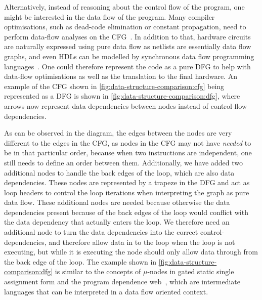 Alternatively, instead of reasoning about the control flow of the program, one
might be interested in the \gls{data flow} of the program.  Many compiler
optimisations, such as dead-code elimination or constant propagation, need to
perform data-flow analyses on the
\gls{CFG}~\cite[]{kildall73_unified_approac_global_progr_optim,kam76_gdfaia}.
In addition to that, hardware circuits are naturally expressed using pure data
flow as netlists are essentially data flow graphs, and even \glspl{HDL} can be
modelled by synchronous data flow programming
languages~\cite{halbwachs91_sdfpll}.  One could therefore represent the code as
a pure \gls{DFG} to help with data-flow optimisations as well as the translation
to the final hardware.  An example of the \gls{CFG} shown in
\cref{fig:data-structure-comparison:cfg} being represented as a \gls{DFG} is
shown in \cref{fig:data-structure-comparison:dfg}, where arrows now represent
data dependencies between nodes instead of control-flow dependencies.

As can be observed in the diagram, the edges between the nodes are very
different to the edges in the \gls{CFG}, as nodes in the \gls{CFG} may not have
\emph{needed} to be in that particular order, because when two instructions are
independent, one still needs to define an order between them.  Additionally, we
have added two additional nodes to handle the back edges of the loop, which are
also data dependencies.  These nodes are represented by a trapeze in the
\gls{DFG} and act as loop headers to control the loop iterations when
interpreting the graph as pure data flow.  These additional nodes are needed
because otherwise the data dependencies present because of the back edges of the
loop would conflict with the data dependency that actually enters the loop.  We
therefore need an additional node to turn the data dependencies into the correct
control-dependencies, and therefore allow data in to the loop when the loop is
not executing, but while it is executing the node should only allow data through
from the back edge of the loop.  The example shown in
\cref{fig:data-structure-comparison:dfg} is similar to the concepts of
$\mu$-nodes in gated static single assignment form and the program dependence
web~\cite{ottenstein90_progr_depen_web,campbell93_refin,havlak94_const,tu95_effic_build_placin_gatin_funct},
which are intermediate languages that can be interpreted in a data flow oriented
context.

\subsubsection{}

